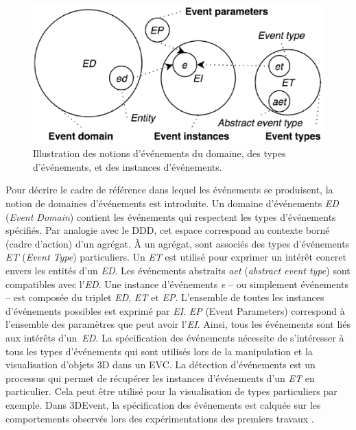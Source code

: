 \begin{figure}[ht]
	\centering
	\includegraphics[width=0.7\columnwidth]{eps/event4.eps}
	\caption{Illustration des notions d'événements du domaine, des types 
		d'événements, et des instances d'événements.}
	\label{fig:representation_event}
\end{figure} 

Pour décrire le cadre de référence dans lequel les événements se produisent, la 
notion de domaines d'événements est introduite. Un domaine d'événements 
\textit{ED} (\textit{Event Domain}) contient les événements qui respectent les 
types d'événements spécifiés. Par analogie avec le \gls{DDD}, cet 
espace correspond au contexte borné (cadre d'action) d'un agrégat. À un agrégat, 
sont associés des types d'événements \textit{ET} (\textit{Event Type}) particuliers. 
Un \textit{ET} est utilisé pour exprimer un intérêt concret envers les entités d'un 
\textit{ED}. 
Les événements abstraits \textit{aet} (\textit{abstract event type}) sont 
compatibles avec l'\textit{ED}. 
Une instance d'événements \textit{e} -- ou simplement 
événements -- est composée du triplet \textit{ED}, \textit{ET} et \textit{EP}. 
L'ensemble de toutes les instances d'événements possibles est exprimé par 
\textit{EI}. \textit{EP} (Event Parameters) correspond à l'ensemble des paramètres 
que peut avoir l'\textit{EI}. Ainsi, tous les événements sont liés aux intérêts 
d'un~\textit{ED}. La spécification des événements nécessite de 
s'intéresser à tous les types d'événements qui sont utilisés lors de la manipulation 
et la visualisation d'objets \gls{3D} dans un \gls{EVC}. La détection d'événements 
est un processus qui permet de récupérer les instances d'événements d'un 
\textit{ET} en particulier. Cela peut être utilisé pour la visualisation de types
particuliers par exemple. Dans 3DEvent, la spécification des événements est 
calquée sur les comportements observés lors des expérimentations des premiers 
travaux \cite{Desprat2015a, Desprat2015b}. 

